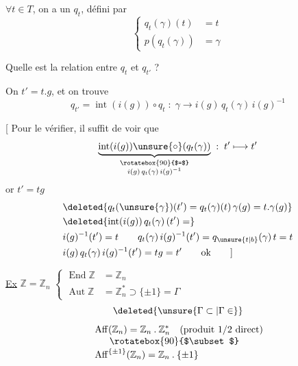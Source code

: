 
$\forall t\in T$, on a un  $q_t$, défini par
\[
\left\{\begin{aligned}q_t(\gamma)(t)&=t\\p(q_t(\gamma))&=\gamma\end{aligned}\right.
\]

Quelle est la relation entre $q_t$ et $q_{t'}$ ?

On  $t'=t.g$, et on trouve
\[
q_{t'}=\operatorname{int}(i(g))\circ q_t
 \;:\; \gamma\longrightarrow i(g)\,q_t(\gamma)\,i(g)^{-1}
\]

[ Pour le vérifier, il suffit de voir que
\[
\underbrace{\operatorname{int}(i(g))\unsure{\circ}(q_t(\gamma))}
 _{\substack{\rotatebox{90}{$=$}\\ i(g)\,q_t(\gamma)\,i(g)^{-1}}}
 \;:\; t'\longmapsto t'
\]
or \quad $t'=tg$
\[
\begin{aligned}
&\deleted{q_t(\unsure{\gamma})(t')=q_t(\gamma)(t)\,\gamma(g)=t.\gamma(g)}\\
&\deleted{\operatorname{int}(i(g))\,q_t(\gamma)\,(t')=}\\
&i(g)^{-1}(t')=t\qquad q_t(\gamma)\,i(g)^{-1}(t')=q_{\unsure{t|b}}(\gamma)\,t=t\\
&i(g)\,q_t(\gamma)\,i(g)^{-1}(t')=tg=t'\qquad\text{ok}\qquad ]
\end{aligned}
\]


\uline{Ex}\quad
$\mathbb{Z}=\mathbb{Z}_n$\quad
$\left\{\begin{aligned}
\operatorname{End}\mathbb{Z}&=\mathbb{Z}_n\\
\operatorname{Aut}\mathbb{Z}&=\mathbb{Z}_n^{*}\supset\{\pm1\}=\Gamma
\end{aligned}\right.$
\[
\deleted{\unsure{\Gamma\subset|\Gamma\in}}
\]
\[
\begin{aligned}
&\operatorname{Aff}(\mathbb{Z}_n)=\mathbb{Z}_n\mathbin{.}\mathbb{Z}_n^{*}
 \quad\text{(produit $1/2$ direct)}\\[-.3em]
&\hspace{1.7em}\rotatebox{90}{$\subset$}\\[-.3em]
&\operatorname{Aff}^{\{\pm1\}}(\mathbb{Z}_n)=\mathbb{Z}_n\mathbin{.}\{\pm1\}
\end{aligned}
\]

